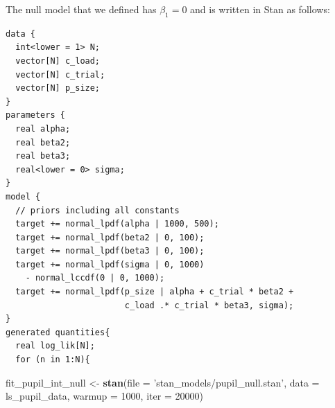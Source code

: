 \documentclass[12pt,]{krantz}
\newenvironment{Shaded}{\begin{snugshade}}{\end{snugshade}}
\newcommand{\KeywordTok}[1]{\textcolor[rgb]{0.13,0.29,0.53}{\textbf{#1}}}
\newcommand{\DataTypeTok}[1]{\textcolor[rgb]{0.13,0.29,0.53}{#1}}
\newcommand{\DecValTok}[1]{\textcolor[rgb]{0.00,0.00,0.81}{#1}}
\newcommand{\StringTok}[1]{\textcolor[rgb]{0.31,0.60,0.02}{#1}}
\newcommand{\OperatorTok}[1]{\textcolor[rgb]{0.81,0.36,0.00}{\textbf{#1}}}
\newcommand{\NormalTok}[1]{#1}
\theoremstyle{definition}
\theoremstyle{definition}
\theoremstyle{definition}
\theoremstyle{remark}
\begin{document}
\begin{Shaded}
\end{Shaded}

The null model that we defined has \(\beta_1 = 0\) and is written in
Stan as follows:

\begin{verbatim}
data {
  int<lower = 1> N;
  vector[N] c_load;
  vector[N] c_trial;
  vector[N] p_size;
}
parameters {
  real alpha;
  real beta2;
  real beta3;
  real<lower = 0> sigma;
}
model {
  // priors including all constants
  target += normal_lpdf(alpha | 1000, 500);
  target += normal_lpdf(beta2 | 0, 100);
  target += normal_lpdf(beta3 | 0, 100);
  target += normal_lpdf(sigma | 0, 1000)
    - normal_lccdf(0 | 0, 1000);
  target += normal_lpdf(p_size | alpha + c_trial * beta2 +
                        c_load .* c_trial * beta3, sigma);
}
generated quantities{
  real log_lik[N];
  for (n in 1:N){
\end{verbatim}

\begin{Shaded}
\begin{Highlighting}[]
\NormalTok{fit_pupil_int_null <-}\StringTok{ }\KeywordTok{stan}\NormalTok{(}\DataTypeTok{file =} \StringTok{'stan_models/pupil_null.stan'}\NormalTok{,}
                          \DataTypeTok{data =}\NormalTok{ ls_pupil_data,}
                          \DataTypeTok{warmup =} \DecValTok{1000}\NormalTok{,}
                          \DataTypeTok{iter =} \DecValTok{20000}\NormalTok{)}
\end{Highlighting}
\end{Shaded}
\end{document}

